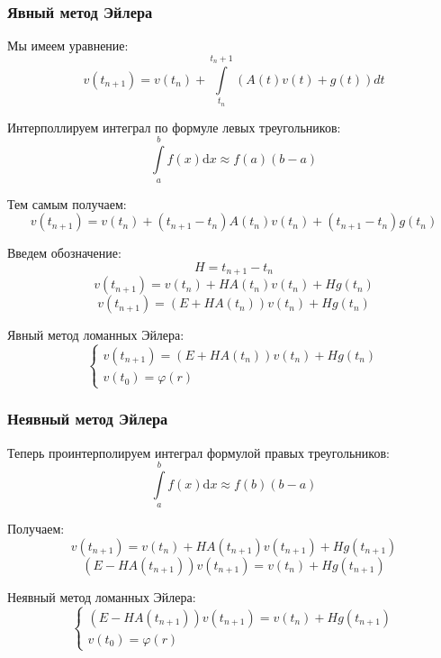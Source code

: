 \subsubsection{Явный метод Эйлера}

Мы имеем уравнение:
\[
  v(t_{n+1}) = v(t_n) + \int\limits_{t_{n}}^{t_n+1} (A(t)v(t) + g(t)) dt
\]

Интерполлируем интеграл по формуле левых треугольников:
\[
  \int\limits_{a}^{b} f(x) \mathrm{d} x \approx f(a) (b - a)
\]

Тем самым получаем:
\[
  v(t_{n+1}) = v(t_n) + (t_{n+1} - t_n) A(t_n) v(t_n) + (t_{n+1} - t_n) g(t_n)
\]

Введем обозначение:
\[
  H = t_{n+1} - t_n
\]
\[
  v(t_{n+1}) = v(t_n) + H A(t_n) v(t_n) + H g(t_n)
\]
\[
  v(t_{n+1}) = (E + HA(t_n))v(t_n) + Hg(t_n)
\]

Явный метод ломанных Эйлера:
\[
  \begin{cases}
    v(t_{n+1}) = (E + HA(t_n))v(t_n) + Hg(t_n) \\
    v(t_0) = \varphi(r)
  \end{cases}
\]

\subsubsection{Неявный метод Эйлера}

Теперь проинтерполируем интеграл формулой правых треугольников:
\[
  \int\limits_{a}^{b} f(x) \mathrm{d} x \approx f(b) (b - a)
\]

Получаем:
\[
  v(t_{n+1}) = v(t_n) + HA(t_{n+1}) v(t_{n+1}) + Hg(t_{n+1})
\]
\[
  (E - HA(t_{n+1})) v(t_{n+1}) = v(t_n) + Hg(t_{n+1})
\]

Неявный метод ломанных Эйлера:
\[
  \begin{cases}
    (E - HA(t_{n+1})) v(t_{n+1}) = v(t_n) + Hg(t_{n+1}) \\
    v(t_0) = \varphi(r)
  \end{cases}
\]
